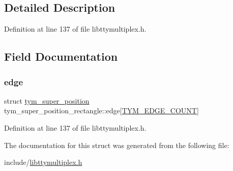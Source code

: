 \subsection{Detailed Description}


Definition at line 137 of file libttymultiplex.\+h.



\subsection{Field Documentation}
\mbox{\label{structtym__super__position__rectangle_aab3865c2a42bee957a40c0e8603d5a31}} 
\subsubsection{\texorpdfstring{edge}{edge}}
{\footnotesize\ttfamily struct \hyperlink{structtym__super__position}{tym\+\_\+super\+\_\+position} tym\+\_\+super\+\_\+position\+\_\+rectangle\+::edge\mbox{[}\hyperlink{libttymultiplex_8h_ad8856480bf629c72938051528100b834ac0bfa9550b58bc257ca09715d719de7f}{T\+Y\+M\+\_\+\+E\+D\+G\+E\+\_\+\+C\+O\+U\+NT}\mbox{]}}



Definition at line 137 of file libttymultiplex.\+h.



The documentation for this struct was generated from the following file\+:\begin{DoxyCompactItemize}
\item 
include/\hyperlink{libttymultiplex_8h}{libttymultiplex.\+h}\end{DoxyCompactItemize}
